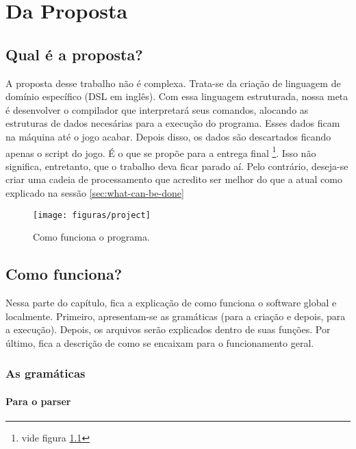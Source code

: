 \chapter{Da Proposta}
\label{cap:propose}

\section{Qual é a proposta?}
\label{sec:what_is}

A proposta desse trabalho não é complexa. Trata-se da criação de linguagem de
domínio específico (DSL em inglês). Com essa linguagem estruturada, nossa meta é
desenvolver o compilador que interpretará seus comandos, alocando as estruturas
de dados necesárias para a execução do programa. Esses dados ficam na máquina
até o jogo acabar. Depois disso, os dados são descartados ficando apenas o
script do jogo. É o que se propõe para a entrega final \footnote{vide figura
\ref{fig:project}}. Isso não significa, entretanto, que o trabalho deva ficar
parado aí. Pelo contrário, deseja-se criar uma cadeia de processamento que
acredito ser melhor do que a atual como explicado na sessão
\ref{sec:what-can-be-done}

\begin{figure}[htb]
  \centering
  \texttt{[image: figuras/project]}
  \caption{\label{fig:project} Como funciona o programa.}
\end{figure}


\section{Como funciona?}
\label{sec:how-it-works}

Nessa parte do capítulo, fica a explicação de como funciona o software global e
localmente. Primeiro, apresentam-se as gramáticas (para a criação e depois, para
a execução). Depois, os arquivos serão explicados dentro de suas funções. Por
último, fica a descrição de como se encaixam para o funcionamento geral.

\subsection{As gramáticas}
\label{subsec:grammar}

\subsubsection{Para o parser}
\label{subsubsec:parser}

